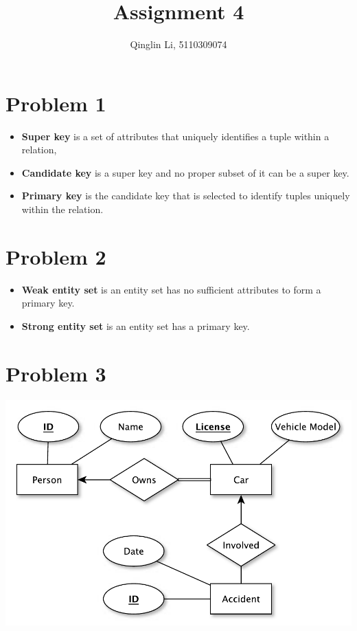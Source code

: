 \documentclass[a4paper,11pt]{article}
\begin{document}
\pagestyle{fancy}
\rfoot{\thepage}
\setlength{\parskip}{0.7ex plus0.2ex minus0.2ex}
\cfoot{\empty}
\lhead{\empty}


\title{Assignment 4}
\author{Qinglin Li, 5110309074}
\date{}
\maketitle

\headheight 3pt
\thispagestyle{fancy}

\section*{Problem 1}
\begin{itemize}
\item \textbf{Super key} is a set of attributes that uniquely identifies a tuple within a relation,
\item \textbf{Candidate key} is a super key and no proper subset of it can be a super key. 
\item \textbf{Primary key} is the candidate key that is selected to identify tuples uniquely within the relation.
\end{itemize}

\section*{Problem 2}
\begin{itemize}
\item \textbf{Weak entity set} is an entity set has no sufficient attributes to form a primary key.
\item \textbf{Strong entity set} is an entity set has a primary key. 
\end{itemize}

\section*{Problem 3}
\includegraphics{p3.pdf}
\end{document}
